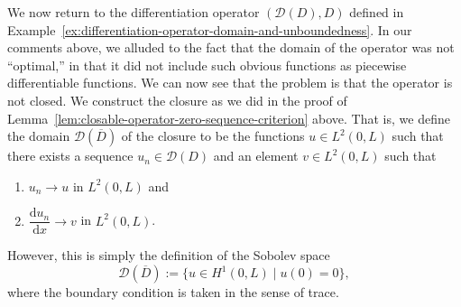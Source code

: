 \begin{Example}
\label{ex:differentiation-operator-closure-sobolev}
We now return to the differentiation operator $(\mathcal{D}(D),D)$ defined in Example~\ref{ex:differentiation-operator-domain-and-unboundedness}. In our comments above, we alluded to the fact that the domain of the operator was not ``optimal,'' in that it did not include such obvious functions as piecewise differentiable functions. We can now see that the problem is that the operator is not closed. We construct the closure as we did in the proof of Lemma~\ref{lem:closable-operator-zero-sequence-criterion} above. That is, we define the domain $\mathcal{D}(\overline D)$ of the closure to be the functions $u\in L^2(0,L)$ such that there exists a sequence $u_n\in\mathcal{D}(D)$ and an element $v\in L^2(0,L)$ such that\begin{enumerate}\item $u_n\to u$ in $L^2(0,L)$ and\item $\dfrac{\mathrm{d}u_n}{\mathrm{d}x}\to v$ in $L^2(0,L)$.\end{enumerate}However, this is simply the definition of the Sobolev space\[\mathcal{D}(\overline D):=\{u\in H^1(0,L)\mid u(0)=0\},\]where the boundary condition is taken in the sense of trace.
\end{Example}

